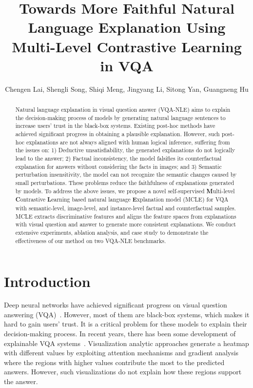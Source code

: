 \documentclass[letterpaper]{article} %
\title{Towards More Faithful Natural Language Explanation Using Multi-Level Contrastive Learning in VQA}
\author {
    Chengen Lai,
    Shengli Song,
    Shiqi Meng,
    Jingyang Li,
    Sitong Yan,
    Guangneng Hu
}
\begin{document}
\maketitle

\begin{abstract}
Natural language explanation in visual question answer (VQA-NLE) aims to explain the decision-making process of models by generating natural language sentences to increase users' trust in the black-box systems. Existing post-hoc methods have achieved significant progress in obtaining a plausible explanation. However, such post-hoc explanations are not always aligned with human logical inference, suffering from the issues on: 1) Deductive unsatisfiability, the generated explanations do not logically lead to the answer; 2) Factual inconsistency, the model falsifies its counterfactual explanation for answers without considering the facts in images; and 3) Semantic perturbation insensitivity, the model can not recognize the semantic changes caused by small perturbations. These problems reduce the faithfulness of explanations generated by models. To address the above issues, we propose a novel self-supervised \textbf{M}ulti-level \textbf{C}ontrastive \textbf{L}earning based natural language \textbf{E}xplanation model (MCLE) for VQA  with semantic-level, image-level, and instance-level factual and counterfactual samples. MCLE extracts discriminative features and aligns the feature spaces from explanations with visual question and answer to generate more consistent explanations. We conduct extensive experiments, ablation analysis, and case study to demonstrate the effectiveness of our method on two VQA-NLE benchmarks.
\end{abstract}


\section{Introduction}

Deep neural networks have achieved significant progress on visual question answering (VQA)~\cite{antol2015vqa}. However, most of them are black-box systems, which makes it hard to gain users' trust. It is a critical problem for these models to explain their decision-making process. In recent years, there has been some development of explainable VQA systems~\cite{patro2019u,chen2022rex}. Visualization analytic approaches generate a heatmap with different values by exploiting attention mechanisms and gradient analysis~\cite{lu2016hierarchical,selvaraju2017grad} where the regions with higher values contribute the most to the predicted answers. However, such visualizations do not explain how these regions support the answer. 
\end{document}
